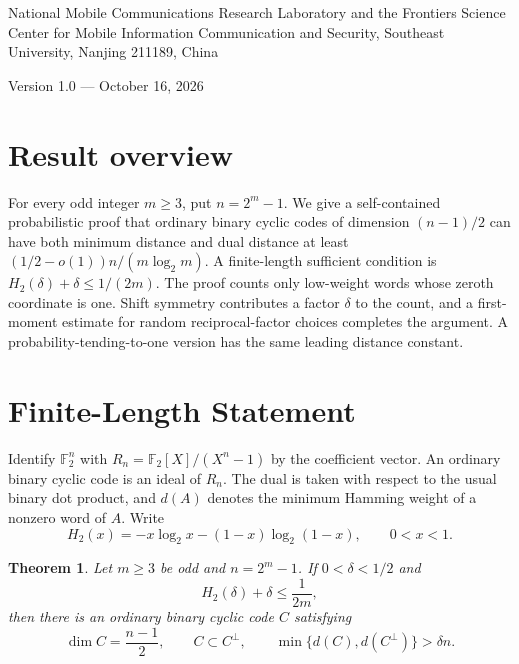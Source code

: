 \documentclass[12pt,letterpaper,onecolumn]{article}
\newtheorem{theorem}{Theorem}[section]
\theoremstyle{remark}
\newcommand{\F}{\mathbb F}
\begin{document}
\par\medskip
{}\medskip
{}\par\smallskip
\noindent\begin{minipage}{\linewidth}\small National Mobile Communications Research Laboratory and the Frontiers Science Center for Mobile Information Communication and Security, Southeast University, Nanjing 211189, China\end{minipage}\par\medskip
\noindent Version 1.0 --- October 16, 2026\par\bigskip

\section*{Result overview}
For every odd integer $m\ge3$, put $n=2^m-1$. We give a self-contained probabilistic proof that ordinary binary cyclic codes of dimension $(n-1)/2$ can have both minimum distance and dual distance at least $(1/2-o(1))n/(m\log_2m)$. A finite-length sufficient condition is $H_2(\delta)+\delta\le1/(2m)$. The proof counts only low-weight words whose zeroth coordinate is one. Shift symmetry contributes a factor $\delta$ to the count, and a first-moment estimate for random reciprocal-factor choices completes the argument. A probability-tending-to-one version has the same leading distance constant.

\section{Finite-Length Statement}
Identify $\F_2^n$ with $R_n=\F_2[X]/(X^n-1)$ by the coefficient vector. An ordinary binary cyclic code is an ideal of $R_n$. The dual is taken with respect to the usual binary dot product, and $d(A)$ denotes the minimum Hamming weight of a nonzero word of $A$. Write
\[
 H_2(x)=-x\log_2x-(1-x)\log_2(1-x),
 \qquad 0<x<1.
\]

\begin{theorem}\label{thm:finite}
Let $m\ge3$ be odd and $n=2^m-1$. If $0<\delta<1/2$ and
\begin{equation}
 H_2(\delta)+\delta\le\frac1{2m},
 \label{eq:condition}
\end{equation}
then there is an ordinary binary cyclic code $C$ satisfying
\begin{equation}
 \dim C=\frac{n-1}{2},\qquad C\subset C^\perp,\qquad
 \min\{d(C),d(C^\perp)\}>\delta n.
 \label{eq:finite}
\end{equation}
\end{theorem}
\end{document}
